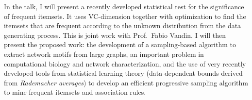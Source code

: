 \documentclass[12pt]{article}
\begin{document}
In the talk, I will present a recently developed statistical test for the
significance of frequent itemsets.
It uses VC-dimension together with optimization to find the itemsets that are
frequent according to the unknown distribution from the data generating process.
This is joint work with Prof.~Fabio Vandin. I will then present the proposed
work: the development of a sampling-based algorithm to extract network motifs
from large graphs, an important problem in computational biology and network
characterization, and the use of very recently developed tools from statistical
learning theory (data-dependent bounds derived from \emph{Rademacher averages})
to develop an efficient progressive sampling algorithm to mine frequent itemsets
and association rules.
\end{document}
